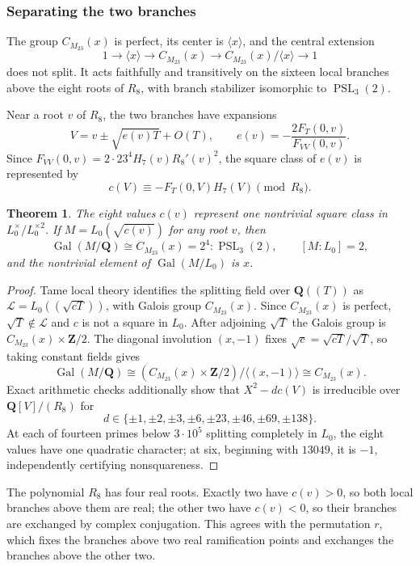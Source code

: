 \documentclass[11pt]{amsart}
\newtheorem{theorem}{Theorem}[section]
\theoremstyle{definition}
\theoremstyle{remark}
\newcommand{\QQ}{\mathbf Q}
\newcommand{\ZZ}{\mathbf Z}
\newcommand{\Gal}{\operatorname{Gal}}
\newcommand{\PSL}{\operatorname{PSL}}
\newcommand{\Cx}{C_{M_{23}}(x)}
\begin{document}
\subsubsection{Separating the two branches}

The group $\Cx$ is perfect, its center is $\langle x\rangle$, and the
central extension
\[
 1\longrightarrow\langle x\rangle\longrightarrow\Cx
 \longrightarrow\Cx/\langle x\rangle\longrightarrow1
\]
does not split.  It acts faithfully and transitively on the sixteen local
branches above the eight roots of $R_8$, with branch stabilizer isomorphic
to $\PSL_3(2)$.

Near a root $v$ of $R_8$, the two branches have expansions
\[
 V=v\pm\sqrt{e(v)T}+O(T),\qquad
 e(v)=-\frac{2F_T(0,v)}{F_{VV}(0,v)}.
\]
Since $F_{VV}(0,v)=2\cdot23^4H_7(v)R_8'(v)^2$, the square class of $e(v)$ is
represented by
\[
 c(V)\equiv-F_T(0,V)H_7(V)\pmod{R_8}.
\]

\begin{theorem}\label{thm:field}
The eight values $c(v)$ represent one nontrivial square class in
$L_0^\times/L_0^{\times2}$.  If $M=L_0(\sqrt{c(v)})$ for any root $v$, then
\[
 \Gal(M/\QQ)\cong\Cx=2^4{:}\PSL_3(2),
 \qquad [M:L_0]=2,
\]
and the nontrivial element of $\Gal(M/L_0)$ is $x$.
\end{theorem}

\begin{proof}
Tame local theory identifies the splitting field over $\QQ((T))$ as
$\mathcal L=L_0((\sqrt{cT}))$, with Galois group $\Cx$.  Since $\Cx$ is
perfect, $\sqrt T\notin\mathcal L$ and $c$ is not a square in $L_0$.  After
adjoining $\sqrt T$ the Galois group is $\Cx\times\ZZ/2$.  The diagonal
involution $(x,-1)$ fixes $\sqrt c=\sqrt{cT}/\sqrt T$, so taking constant
fields gives
\[
 \Gal(M/\QQ)\cong
 (\Cx\times\ZZ/2)/\langle(x,-1)\rangle\cong\Cx.
\]
Exact arithmetic checks additionally show that $X^2-dc(V)$ is irreducible
over $\QQ[V]/(R_8)$ for
\[
 d\in\{\pm1,\pm2,\pm3,\pm6,\pm23,\pm46,\pm69,\pm138\}.
\]
At each of fourteen primes below $3\cdot10^5$ splitting completely in
$L_0$, the eight values have one quadratic character; at six, beginning
with $13049$, it is $-1$, independently certifying nonsquareness.
\end{proof}

The polynomial $R_8$ has four real roots.  Exactly two have $c(v)>0$, so
both local branches above them are real; the other two have $c(v)<0$, so
their branches are exchanged by complex conjugation.  This agrees with the
permutation $r$, which fixes the branches above two real ramification points
and exchanges the branches above the other two.
\end{document}
